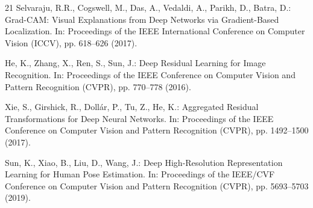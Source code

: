 \documentclass[runningheads]{llncs}
\begin{document}
\begin{thebibliography}{21}
Selvaraju, R.R., Cogswell, M., Das, A., Vedaldi, A., Parikh, D., Batra, D.: Grad-CAM: Visual Explanations from Deep Networks via Gradient-Based Localization. In: Proceedings of the IEEE International Conference on Computer Vision (ICCV), pp. 618--626 (2017). 

He, K., Zhang, X., Ren, S., Sun, J.: Deep Residual Learning for Image Recognition. In: Proceedings of the IEEE Conference on Computer Vision and Pattern Recognition (CVPR), pp. 770--778 (2016). 

Xie, S., Girshick, R., Dollár, P., Tu, Z., He, K.: Aggregated Residual Transformations for Deep Neural Networks. In: Proceedings of the IEEE Conference on Computer Vision and Pattern Recognition (CVPR), pp. 1492--1500 (2017). 

Sun, K., Xiao, B., Liu, D., Wang, J.: Deep High-Resolution Representation Learning for Human Pose Estimation. In: Proceedings of the IEEE/CVF Conference on Computer Vision and Pattern Recognition (CVPR), pp. 5693--5703 (2019). 

\end{thebibliography}
\end{document}
